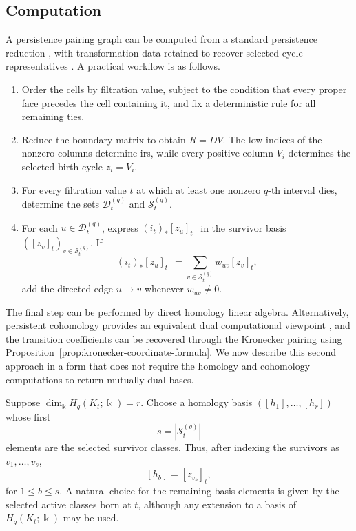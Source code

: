 \documentclass[11pt]{article}
\theoremstyle{paperdefinition}
\theoremstyle{paperplain}
\theoremstyle{paperremark}
\begin{document}
\subsection{Computation}
\label{subsec:computation}

A persistence pairing graph can be computed from a standard persistence reduction \cite{edelsbrunner2002topological,zomorodian2005computing}, with transformation data retained to recover selected cycle representatives \cite{hang2021umatch}. A practical workflow is as follows.

\begin{enumerate}
\item Order the cells by filtration value, subject to the condition that every proper face precedes the cell containing it, and fix a deterministic rule for all remaining ties.
\item Reduce the boundary matrix to obtain $R=DV$. The low indices of the nonzero columns determine irs, while every positive column $V_i$ determines the selected birth cycle $z_i=V_i$.
\item For every filtration value $t$ at which at least one nonzero $q$-th interval dies, determine the sets $\mathcal D_t^{(q)}$ and $\mathcal S_t^{(q)}$.
\item For each $u\in\mathcal D_t^{(q)}$, express $(i_t)_*[z_u]_{t^-}$ in the survivor basis $\left([z_v]_t\right)_{v\in\mathcal S_t^{(q)}}$. If
\[
(i_t)_*[z_u]_{t^-} = \sum_{v\in\mathcal S_t^{(q)}}w_{uv}[z_v]_t,
\]
add the directed edge $u\longrightarrow v$ whenever $w_{uv}\neq0$.
\end{enumerate}

The final step can be performed by direct homology linear algebra. Alternatively, persistent cohomology provides an equivalent dual computational viewpoint \cite{desilva2011dualities}, and the transition coefficients can be recovered through the Kronecker pairing using Proposition~\ref{prop:kronecker-coordinate-formula}. We now describe this second approach in a form that does not require the homology and cohomology computations to return mutually dual bases.

Suppose $\dim_{\Bbbk}H_q(K_t;\Bbbk)=r$. Choose a homology basis $([h_1],\ldots,[h_r])$ whose first
\[
s = \left|\mathcal S_t^{(q)}\right|
\]
elements are the selected survivor classes. Thus, after indexing the survivors as $v_1,\ldots,v_s$,
\[
[h_b]=[z_{v_b}]_t,
\]
for $1\leq b\leq s$. A natural choice for the remaining basis elements is given by the selected active classes born at $t$, although any extension to a basis of $H_q(K_t;\Bbbk)$ may be used.
\end{document}
